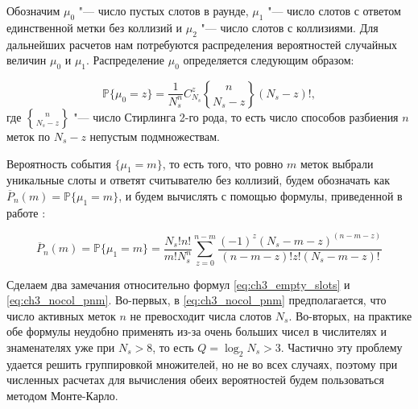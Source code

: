 Обозначим $\mu_0$ "--- число пустых слотов в раунде, $\mu_1$ "--- число слотов с ответом единственной метки без коллизий и $\mu_2$ "--- число слотов с коллизиями. Для дальнейших расчетов нам потребуются распределения вероятностей случайных величин $\mu_0$ и $\mu_1$. Распределение $\mu_0$ определяется следующим образом:

\begin{equation}\label{eq:ch3_empty_slots}
	\mathbb{P}\{\mu_0 = z\} = \frac{1}{N_s^n} C_{N_s}^z {n\brace N_s-z} (N_s - z)!,
\end{equation}
где ${ n\brace N_s-z }$ "--- число Стирлинга 2-го рода, то есть число способов разбиения $n$ меток по $N_s - z$ непустым подмножествам.

Вероятность события $\{ \mu_1 = m \}$, то есть того, что ровно $m$ меток выбрали уникальные слоты и ответят считывателю без коллизий, будем обозначать как $\overline{P}_n(m) = \mathbb{P}\{ \mu_1 = m \}$, и будем вычислять с помощью формулы, приведенной в работе \cite{Vales-Alonso2011}:

\begin{equation}\label{eq:ch3_nocol_pnm}
	\overline{P}_n(m) = \mathbb{P}\{ \mu_1 = m \} = \frac{N_s! n!}{m! N_s^n} \sum\limits_{z=0}^{n-m}
		\frac{(-1)^z (N_s - m - z)^{(n - m - z)}}{(n - m - z)! z! (N_s - m - z)!}
\end{equation}

Сделаем два замечания относительно формул \eqref{eq:ch3_empty_slots} и \eqref{eq:ch3_nocol_pnm}. Во-первых, в \eqref{eq:ch3_nocol_pnm} предполагается, что число активных меток $n$ не превосходит числа слотов $N_s$. Во-вторых, на практике обе формулы неудобно применять из-за очень больших чисел в числителях и знаменателях уже при $N_s > 8$, то есть $Q = \log_2 N_s > 3$. Частично эту проблему удается решить группировкой множителей, но не во всех случаях, поэтому при численных расчетах для вычисления обеих вероятностей будем пользоваться методом Монте-Карло.

